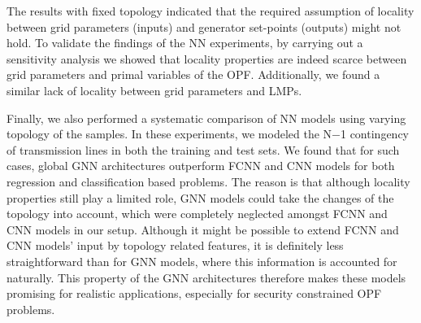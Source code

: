 \documentclass[journal]{IEEEtran}
\def\nmo{N$-$1}%
\begin{document}
The results with fixed topology indicated that the required assumption of locality between grid parameters (inputs) and generator set-points (outputs) might not hold.
To validate the findings of the NN experiments, by carrying out a sensitivity analysis we showed that locality properties are indeed scarce between grid parameters and primal variables of the OPF.
Additionally, we found a similar lack of locality between grid parameters and LMPs.

Finally, we also performed a systematic comparison of NN models using varying topology of the samples.
In these experiments, we modeled the \nmo{} contingency of transmission lines in both the training and test sets.
We found that for such cases, global GNN architectures outperform FCNN and CNN models for both regression and classification based problems.
The reason is that although locality properties still play a limited role, GNN models could take the changes of the topology into account, which were completely neglected amongst FCNN and CNN models in our setup.
Although it might be possible to extend FCNN and CNN models' input by topology related features, it is definitely less straightforward than for GNN models, where this information is accounted for naturally.
This property of the GNN architectures therefore makes these models promising for realistic applications, especially for security constrained OPF problems.


\ifCLASSOPTIONcaptionsoff
  \newpage
\fi

%




\newpage

\end{document}
